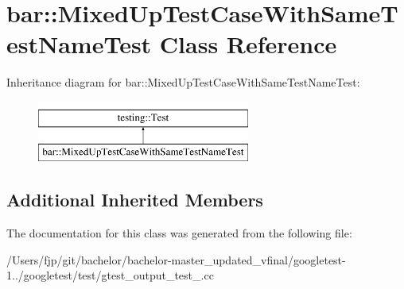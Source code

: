 \hypertarget{classbar_1_1_mixed_up_test_case_with_same_test_name_test}{}\section{bar\+:\+:Mixed\+Up\+Test\+Case\+With\+Same\+Test\+Name\+Test Class Reference}
\label{classbar_1_1_mixed_up_test_case_with_same_test_name_test}
Inheritance diagram for bar\+:\+:Mixed\+Up\+Test\+Case\+With\+Same\+Test\+Name\+Test\+:\begin{figure}[H]
\begin{center}
\leavevmode
\includegraphics[height=2.000000cm]{classbar_1_1_mixed_up_test_case_with_same_test_name_test}
\end{center}
\end{figure}
\subsection*{Additional Inherited Members}


The documentation for this class was generated from the following file\+:\begin{DoxyCompactItemize}
\item 
/\+Users/fjp/git/bachelor/bachelor-\/master\+\_\+updated\+\_\+vfinal/googletest-\/1../googletest/test/gtest\+\_\+output\+\_\+test\+\_\+.\+cc\end{DoxyCompactItemize}
